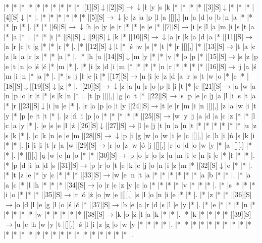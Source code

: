 \documentclass[11pt]{article}
\newcommand\drarr{$\rightarrow \!\!\!\!\! \downarrow$}
\newcommand\rarr{$\rightarrow$}
\newcommand\darr{$\downarrow$}
\begin{document}
\noindent\begin{Puzzle}{25}{23}|*	|*	|*	|*	|*	|*	|*	|*	|*	|*	|[1][S]\darr	|[2][S]\drarr	|ł	|y	|s	|k	|*	|*	|*	|*	|[3][S]\darr	|*	|*	|*	|[4][S]\darr	|*	|.
|*	|*	|*	|*	|*	|*	|[5][S]\drarr	|c	|z	|a	|p	|l	|a	|[][,]{ }	|n	|a	|d	|o	|b	|n	|a	|*	|*	|*	|p	|*	|.
|*	|*	|[6][S]\drarr	|h	|o	|y	|e	|r	|*	|*	|e	|e	|*	|[7][S]\rarr	|i	|s	|l	|a	|m	|i	|s	|t	|a	|*	|a	|*	|.
|*	|*	|i	|*	|[8][S]\darr	|[9][S]\darr	|k	|*	|[10][S]\drarr	|a	|r	|k	|a	|d	|a	|*	|[11][S]\rarr	|a	|r	|c	|t	|g	|*	|*	|r	|*	|.
|*	|[12][S]\darr	|l	|*	|ś	|w	|s	|*	|t	|*	|r	|[][,]{ }	|*	|[13][S]\rarr	|t	|a	|c	|z	|k	|a	|r	|z	|*	|*	|a	|*	|.
|*	|h	|u	|[14][S]\darr	|m	|y	|*	|*	|v	|*	|o	|p	|*	|[15][S]\rarr	|s	|z	|p	|e	|t	|n	|o	|ś	|ć	|*	|m	|*	|.
|*	|i	|z	|d	|i	|m	|*	|*	|*	|*	|n	|r	|*	|*	|*	|*	|[16][S]\rarr	|j	|a	|ś	|m	|i	|n	|*	|a	|*	|.
|*	|s	|j	|ł	|e	|i	|*	|[17][S]\rarr	|n	|i	|e	|z	|d	|a	|r	|s	|t	|w	|o	|*	|e	|*	|[18][S]\darr	|[19][S]\darr	|g	|*	|.
|[20][S]\drarr	|z	|a	|u	|r	|o	|p	|l	|i	|t	|*	|e	|[21][S]\rarr	|a	|w	|a	|n	|p	|o	|r	|t	|*	|s	|k	|n	|*	|.
|t	|p	|[][,]{ }	|g	|c	|t	|*	|[22][S]\rarr	|s	|p	|e	|c	|j	|a	|l	|i	|s	|t	|a	|*	|r	|[23][S]\darr	|i	|u	|e	|*	|.
|r	|a	|p	|o	|i	|y	|[24][S]\rarr	|t	|e	|r	|m	|i	|n	|[][,]{ }	|z	|a	|w	|i	|t	|y	|*	|p	|e	|t	|t	|*	|.
|z	|ń	|i	|p	|o	|*	|*	|*	|*	|*	|[25][S]\rarr	|w	|y	|j	|a	|d	|a	|c	|z	|*	|*	|l	|c	|a	|y	|*	|.
|e	|s	|e	|ł	|ż	|[26][S]\darr	|[27][S]\rarr	|l	|e	|j	|t	|n	|a	|n	|t	|*	|*	|*	|*	|*	|*	|u	|z	|s	|k	|*	|.
|c	|k	|n	|e	|e	|m	|[28][S]\drarr	|p	|i	|g	|w	|o	|w	|i	|e	|c	|[][,]{ }	|c	|h	|i	|ń	|s	|k	|i	|*	|*	|.
|i	|i	|i	|t	|r	|a	|w	|[29][S]\rarr	|r	|o	|z	|w	|ó	|j	|[][,]{ }	|r	|o	|d	|o	|w	|y	|*	|a	|[][,]{ }	|*	|*	|.
|*	|[][,]{ }	|ą	|w	|c	|n	|o	|*	|*	|[30][S]\rarr	|p	|o	|r	|o	|z	|u	|m	|i	|e	|n	|i	|e	|*	|ł	|*	|*	|.
|*	|p	|d	|i	|a	|d	|s	|[31][S]\rarr	|p	|r	|o	|t	|e	|k	|c	|j	|o	|n	|i	|z	|m	|*	|[32][S]\darr	|e	|*	|*	|.
|*	|t	|z	|e	|*	|y	|c	|*	|*	|*	|[33][S]\rarr	|w	|e	|n	|t	|a	|*	|*	|*	|*	|*	|*	|a	|b	|*	|*	|.
|*	|a	|a	|c	|*	|l	|h	|*	|*	|*	|[34][S]\rarr	|o	|r	|c	|z	|y	|c	|a	|*	|*	|*	|*	|v	|*	|*	|*	|.
|*	|s	|*	|*	|*	|i	|o	|*	|*	|*	|[35][S]\rarr	|r	|ó	|ż	|o	|w	|e	|[][,]{ }	|s	|ł	|o	|n	|i	|e	|*	|*	|.
|*	|z	|*	|*	|[36][S]\rarr	|o	|d	|l	|e	|g	|ł	|o	|ś	|ć	|*	|[37][S]\rarr	|b	|e	|a	|r	|d	|s	|l	|e	|y	|*	|.
|*	|e	|*	|*	|*	|n	|*	|*	|*	|*	|*	|w	|*	|*	|*	|*	|*	|[38][S]\rarr	|k	|o	|ź	|l	|a	|k	|*	|*	|.
|*	|k	|*	|*	|*	|*	|[39][S]\rarr	|u	|c	|h	|w	|y	|t	|[][,]{ }	|ś	|l	|i	|z	|g	|o	|w	|y	|*	|*	|*	|*	|.
|*	|*	|*	|*	|*	|*	|*	|*	|*	|*	|*	|*	|*	|*	|*	|*	|*	|*	|*	|*	|*	|*	|*	|*	|*	|*	|.\end{Puzzle}
\end{document}
